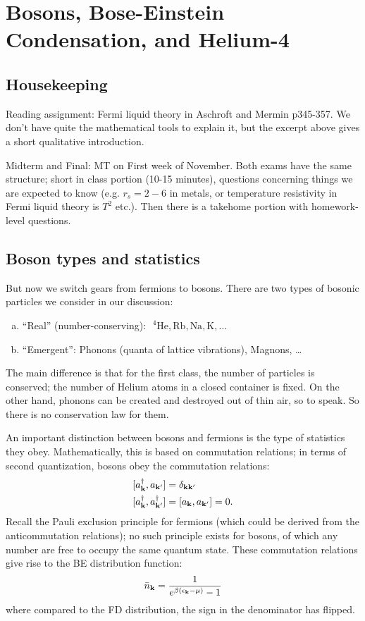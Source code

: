 \section{Bosons, Bose-Einstein Condensation, and Helium-4}
\subsection{Housekeeping}
Reading assignment: Fermi liquid theory in Aschroft and Mermin p345-357. We don't have quite the mathematical tools to explain it, but the excerpt above gives a short qualitative introduction.

Midterm and Final: MT on First week of November. Both exams have the same structure; short in class portion (10-15 minutes), questions concerning things we are expected to know (e.g. $r_s = 2-6$ in metals, or temperature resistivity in Fermi liquid theory is $T^2$ etc.). Then there is a takehome portion with homework-level questions.

\subsection{Boson types and statistics}

But now we switch gears from fermions to bosons. There are two types of bosonic particles we consider in our discussion:
\begin{enumerate}[(a)]
    \item ``Real'' (number-conserving): $\phantom{i}^4\text{He}, \text{Rb}, \text{Na}, \text{K}, \ldots$
    \item ``Emergent'': Phonons (quanta of lattice vibrations), Magnons, \ldots 
\end{enumerate}
The main difference is that for the first class, the number of particles is conserved; the number of Helium atoms in a closed container is fixed. On the other hand, phonons can be created and destroyed out of thin air, so to speak. So there is no conservation law for them.

An important distinction between bosons and fermions is the type of statistics they obey. Mathematically, this is based on commutation relations; in terms of second quantization, bosons obey the commutation relations:
\begin{equation}
    \begin{split}
        &[a_{\mathbf{k}}^\dagger, a_{\mathbf{k'}}] = \delta_{\mathbf{k}\mathbf{k}'}
        \\ &[a_{\mathbf{k}}^\dagger, a_{\mathbf{k'}}^\dagger] = [a_{\mathbf{k}}, a_{\mathbf{k'}}] = 0.
    \end{split}
\end{equation}
Recall the Pauli exclusion principle for fermions (which could be derived from the anticommutation relations); no such principle exists for bosons, of which any number are free to occupy the same quantum state. These commutation relations give rise to the BE distribution function:
\begin{align*}
    \bar{n}_{\mathbf{k}} = \frac{1}{e^{\beta(\epsilon_{\mathbf{k}} - \mu)} - 1}
\end{align*}
where compared to the FD distribution, the sign in the denominator has flipped. 

